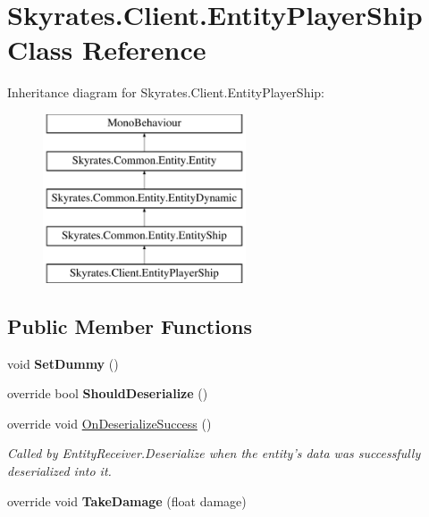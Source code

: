 \hypertarget{class_skyrates_1_1_client_1_1_entity_player_ship}{\section{Skyrates.\-Client.\-Entity\-Player\-Ship Class Reference}
\label{class_skyrates_1_1_client_1_1_entity_player_ship}
}
Inheritance diagram for Skyrates.\-Client.\-Entity\-Player\-Ship\-:\begin{figure}[H]
\begin{center}
\leavevmode
\includegraphics[height=5.000000cm]{class_skyrates_1_1_client_1_1_entity_player_ship}
\end{center}
\end{figure}
\subsection*{Public Member Functions}
\begin{DoxyCompactItemize}
\item 
\hypertarget{class_skyrates_1_1_client_1_1_entity_player_ship_a07c9178e033dfc799ae25af543029c12}{void {\bfseries Set\-Dummy} ()}\label{class_skyrates_1_1_client_1_1_entity_player_ship_a07c9178e033dfc799ae25af543029c12}

\item 
\hypertarget{class_skyrates_1_1_client_1_1_entity_player_ship_a1d9463f5a6af5211c086a2b8c0a7e920}{override bool {\bfseries Should\-Deserialize} ()}\label{class_skyrates_1_1_client_1_1_entity_player_ship_a1d9463f5a6af5211c086a2b8c0a7e920}

\item 
override void \hyperlink{class_skyrates_1_1_client_1_1_entity_player_ship_ab7106388ce039e10be38c27906372312}{On\-Deserialize\-Success} ()
\begin{DoxyCompactList}\small\item\em Called by Entity\-Receiver.\-Deserialize when the entity's data was successfully deserialized into it. \end{DoxyCompactList}\item 
\hypertarget{class_skyrates_1_1_client_1_1_entity_player_ship_aa62c6fb08baef4d375307dd92a74bc00}{override void {\bfseries Take\-Damage} (float damage)}\label{class_skyrates_1_1_client_1_1_entity_player_ship_aa62c6fb08baef4d375307dd92a74bc00}

\end{DoxyCompactItemize}
